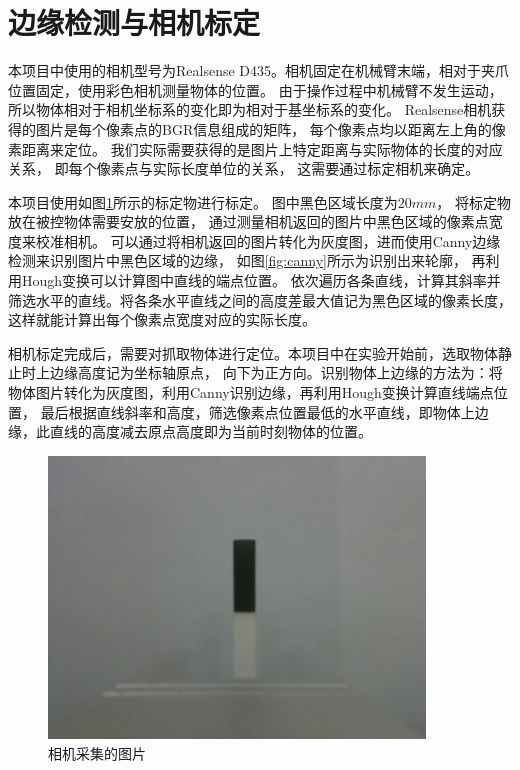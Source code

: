\section{边缘检测与相机标定}
本项目中使用的相机型号为Realsense D435。相机固定在机械臂末端，相对于夹爪位置固定，使用彩色相机测量物体的位置。
由于操作过程中机械臂不发生运动，
所以物体相对于相机坐标系的变化即为相对于基坐标系的变化。
Realsense相机获得的图片是每个像素点的BGR信息组成的矩阵，
每个像素点均以距离左上角的像素距离来定位。
我们实际需要获得的是图片上特定距离与实际物体的长度的对应关系，
即每个像素点与实际长度单位的关系， 这需要通过标定相机来确定。

本项目使用如图\ref{fig:src}所示的标定物进行标定。
图中黑色区域长度为$20mm$， 将标定物放在被控物体需要安放的位置，
通过测量相机返回的图片中黑色区域的像素点宽度来校准相机。
可以通过将相机返回的图片转化为灰度图，进而使用Canny边缘检测来识别图片中黑色区域的边缘，
如图\ref{fig:canny}所示为识别出来轮廓， 再利用Hough变换可以计算图中直线的端点位置。
依次遍历各条直线，计算其斜率并筛选水平的直线。将各条水平直线之间的高度差最大值记为黑色区域的像素长度，
这样就能计算出每个像素点宽度对应的实际长度。


相机标定完成后，需要对抓取物体进行定位。本项目中在实验开始前，选取物体静止时上边缘高度记为坐标轴原点，
向下为正方向。识别物体上边缘的方法为：将物体图片转化为灰度图，利用Canny识别边缘，再利用Hough变换计算直线端点位置，
最后根据直线斜率和高度，筛选像素点位置最低的水平直线，即物体上边缘，此直线的高度减去原点高度即为当前时刻物体的位置。

\begin{figure}[!ht]
  \centering
  \includegraphics[width=10cm]{chapter04/pic/src}
  \caption{\label{fig:src}
    相机采集的图片}
  \vspace{-0.3cm}
\end{figure}

